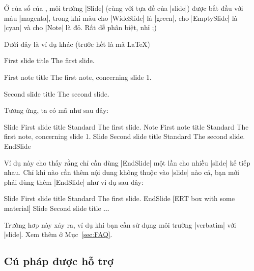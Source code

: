 Ở của sổ của \LyX, môi trường |Slide| (cùng với tựa đề của |slide|)
được bắt đầu với màu |magenta|, trong khi màu cho |WideSlide| là |green|,
cho |EmptySlide| là |cyan| và cho |Note| là đỏ. Rất dễ phân biệt, nhỉ ;)

Dưới đây là ví dụ khác (trước hết là mã \LaTeX{})
\begin{example}
 \begin{slide}{First slide title}
   The first slide.
 \end{slide}
 \begin{note}{First note title}
   The first note, concerning slide 1.
 \end{note}
 \begin{slide}{Second slide title}
   The second slide.
 \end{slide}
\end{example}
Tương ứng, ta có mã \LyX{} như sau đây:
\begin{example}
 Slide         First slide title
 Standard      The first slide.
 Note          First note title
 Standard      The first note, concerning slide 1.
 Slide         Second slide title
 Standard      The second slide.
 EndSlide
\end{example}
Ví dụ này cho thấy rằng chỉ cần dùng |EndSlide| một lần cho nhiều |slide|
kế tiếp nhau. Chỉ khi nào cần thêm nội dung không thuộc vào |slide| nào cả,
bạn mới phải dùng thêm |EndSlide| như ví dụ sau đây:
\begin{example}
 Slide         First slide title
 Standard      The first slide.
 EndSlide
 [ERT box with some material]
 Slide         Second slide title
 ...
\end{example}
Trường hơp này xảy ra, ví dụ khi bạn cần sử dụng môi trường |verbatim|
với |slide|. Xem thêm ở Mục~\vref{sec:FAQ}.

\subsection{\texorpdfstring{Cú pháp được hỗ trợ}{Cu phap duoc ho tro}} %

